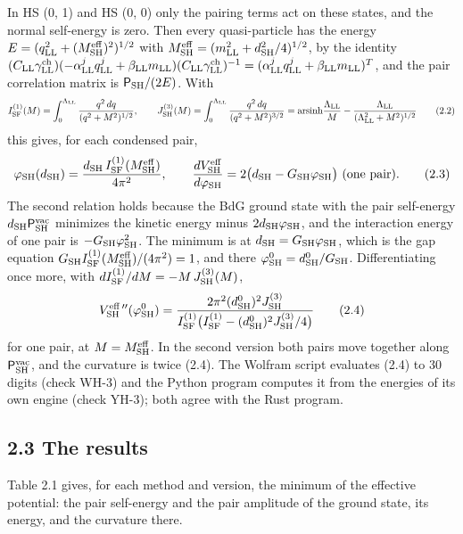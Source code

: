 \documentclass[
  10pt,
]{article}
\begin{document}
In HS (0, 1) and HS (0, 0) only the pairing terms act on these states,
and the normal self-energy is zero. Then every quasi-particle has the
energy \(E=(q_{\rm LL}^2+(M^{\rm eff}_{\rm SH})^2)^{1/2}\) with
\(M^{\rm eff}_{\rm SH}=(m_{\rm LL}^2+d_{\rm SH}^2/4)^{1/2}\), by the
identity
\((C_{\rm LL}\gamma^{\rm ch}_{\rm LL})(-\alpha^j_{\rm LL}q^j_{\rm LL}+\beta_{\rm LL}m_{\rm LL})(C_{\rm LL}\gamma^{\rm ch}_{\rm LL})^{-1}=(\alpha^j_{\rm LL}q^j_{\rm LL}+\beta_{\rm LL}m_{\rm LL})^T\),
and the pair correlation matrix is \(\mathsf P_{\rm SH}/(2E)\). With
\[I^{(1)}_{\rm SF}(M)=\int_0^{\Lambda_{\rm LL}}\frac{q^2\,dq}{(q^2+M^2)^{1/2}},\qquad J^{(3)}_{\rm SH}(M)=\int_0^{\Lambda_{\rm LL}}\frac{q^2\,dq}{(q^2+M^2)^{3/2}}=\mathrm{arsinh}\frac{\Lambda_{\rm LL}}{M}-\frac{\Lambda_{\rm LL}}{(\Lambda_{\rm LL}^2+M^2)^{1/2}}\tag{2.2}\]
this gives, for each condensed pair,
\[\varphi_{\rm SH}(d_{\rm SH})=\frac{d_{\rm SH}\,I^{(1)}_{\rm SF}(M^{\rm eff}_{\rm SH})}{4\pi^2},\qquad\frac{dV^{\rm eff}_{\rm SH}}{d\varphi_{\rm SH}}=2\big(d_{\rm SH}-G_{\rm SH}\varphi_{\rm SH}\big)\ \text{(one pair)}.\tag{2.3}\]
The second relation holds because the BdG ground state with the pair
self-energy \(d_{\rm SH}\mathsf P^{\rm vac}_{\rm SH}\) minimizes the
kinetic energy minus \(2d_{\rm SH}\varphi_{\rm SH}\), and the
interaction energy of one pair is \(-G_{\rm SH}\varphi_{\rm SH}^2\). The
minimum is at \(d_{\rm SH}=G_{\rm SH}\varphi_{\rm SH}\), which is the
gap equation
\(G_{\rm SH}I^{(1)}_{\rm SF}(M^{\rm eff}_{\rm SH})/(4\pi^2)=1\), and
there \(\varphi^0_{\rm SH}=d^0_{\rm SH}/G_{\rm SH}\). Differentiating
once more, with \(dI^{(1)}_{\rm SF}/dM=-M\,J^{(3)}_{\rm SH}(M)\),
\[V^{\rm eff\,\prime\prime}_{\rm SH}(\varphi^0_{\rm SH})=\frac{2\pi^2(d^0_{\rm SH})^2J^{(3)}_{\rm SH}}{I^{(1)}_{\rm SF}\big(I^{(1)}_{\rm SF}-(d^0_{\rm SH})^2J^{(3)}_{\rm SH}/4\big)}\tag{2.4}\]
for one pair, at \(M=M^{\rm eff}_{\rm SH}\). In the second version both
pairs move together along \(\mathsf P^{\rm vac}_{\rm SH}\), and the
curvature is twice (2.4). The Wolfram script evaluates (2.4) to 30
digits (check WH-3) and the Python program computes it from the energies
of its own engine (check YH-3); both agree with the Rust program.

\hypertarget{the-results}{%
\subsection{2.3 The results}\label{the-results}}

Table 2.1 gives, for each method and version, the minimum of the
effective potential: the pair self-energy and the pair amplitude of the
ground state, its energy, and the curvature there.
\end{document}
